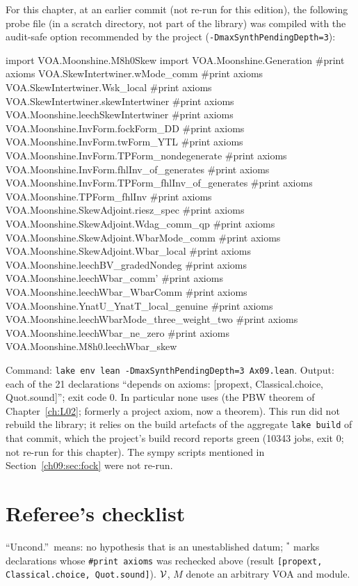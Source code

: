 For this chapter, at an earlier commit (not re-run for this edition), the following probe file (in a scratch directory,
not part of the library) was compiled with the audit-safe option recommended by the project
(\texttt{-DmaxSynthPendingDepth=3}):
\begin{plaincode}
import VOA.Moonshine.M8h0Skew
import VOA.Moonshine.Generation
#print axioms VOA.SkewIntertwiner.wMode_comm
#print axioms VOA.SkewIntertwiner.Wsk_local
#print axioms VOA.SkewIntertwiner.skewIntertwiner
#print axioms VOA.Moonshine.leechSkewIntertwiner
#print axioms VOA.Moonshine.InvForm.fockForm_DD
#print axioms VOA.Moonshine.InvForm.twForm_YTL
#print axioms VOA.Moonshine.InvForm.TPForm_nondegenerate
#print axioms VOA.Moonshine.InvForm.fhlInv_of_generates
#print axioms VOA.Moonshine.InvForm.TPForm_fhlInv_of_generates
#print axioms VOA.Moonshine.TPForm_fhlInv
#print axioms VOA.Moonshine.SkewAdjoint.riesz_spec
#print axioms VOA.Moonshine.SkewAdjoint.Wdag_comm_qp
#print axioms VOA.Moonshine.SkewAdjoint.WbarMode_comm
#print axioms VOA.Moonshine.SkewAdjoint.Wbar_local
#print axioms VOA.Moonshine.leechBV_gradedNondeg
#print axioms VOA.Moonshine.leechWbar_comm'
#print axioms VOA.Moonshine.leechWbar_WbarComm
#print axioms VOA.Moonshine.YnatU_YnatT_local_genuine
#print axioms VOA.Moonshine.leechWbarMode_three_weight_two
#print axioms VOA.Moonshine.leechWbar_ne_zero
#print axioms VOA.Moonshine.M8h0.leechWbar_skew
\end{plaincode}
Command: \texttt{lake env lean -DmaxSynthPendingDepth=3 Ax09.lean}. Output: each of the 21
declarations ``depends on axioms: [propext, Classical.choice, Quot.sound]''; exit code $0$. In
particular none uses  (the PBW theorem of Chapter~\ref{ch:L02}; formerly a project axiom, now a theorem). This run did not rebuild the library; it
relies on the build artefacts of the aggregate \texttt{lake build} of that commit, which the project's
build record reports green (10343 jobs, exit $0$; not re-run for this chapter). The sympy scripts mentioned in
Section~\ref{ch09:sec:fock} were not re-run.

\section{Referee's checklist}\label{ch09:sec:checklist}

``Uncond.''\ means: no hypothesis that is an unestablished datum; $^\ast$ marks declarations whose
\texttt{\#print axioms} was rechecked above (result \texttt{[propext, Classical.choice, Quot.sound]}).
$\mathcal{V}$, $M$ denote an arbitrary VOA and module.

